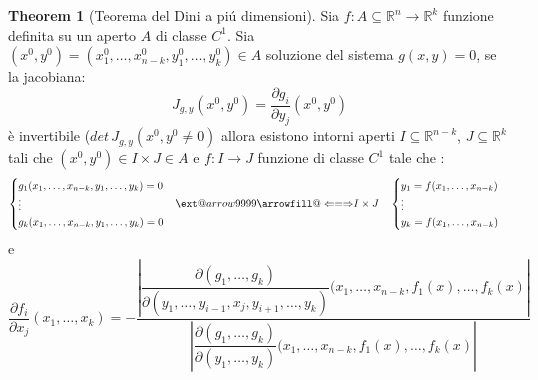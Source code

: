 \documentclass[leqno]{article}
\makeatletter
\newcommand\xLeftrightarrow[2][]{%
	\ext@arrow 9999{\Longleftrightarrowfill@}{#1}{#2}}
\newcommand\Longleftrightarrowfill@{%
	\arrowfill@\Leftarrow\Relbar\Rightarrow}
\theoremstyle{definition}
\numberwithin{equation}{section}
\newtheorem{theorem}{Theorem}[section]
\theoremstyle{remark}
\makeatother
\begin{document}
	\begin{theorem}[Teorema del Dini a piú dimensioni]
		Sia $f:A\subseteq \mathbb{R}^n \rightarrow \mathbb{R}^k$ funzione definita su un aperto $A$ di classe $C^1$. Sia $(x^0,y^0)=(x_1^0,\dots,x_{n-k}^0,y_1^0,\dots,y_k^0)\in A$ soluzione del sistema $g(x,y)=0$, se la jacobiana:
		\begin{equation}
			J_{g,y}(x^0,y^0)=\dfrac{\partial g_i}{\partial y_j}(x^0,y^0)
		\end{equation}
		è invertibile ($det \, J_{g,y}(x^0,y^0\neq 0)$ allora esistono intorni aperti $I\subseteq \mathbb{R}^{n-k}$, $J\subseteq \mathbb{R}^k$ tali che $(x^0,y^0)\in I \times J \in A$ e $f: I \rightarrow J$ funzione di classe $C^1$ tale che : 
		\begin{equation}
			\begin{split}
				\begin{cases}
					g_1(x_1,\dots,x_{n-k},y_1,\dots,y_k)=0\\
					\vdots \\
					g_k(x_1,\dots,x_{n-k},y_1,\dots,y_k)=0
				\end{cases}
			\end{split}
			\begin{split}
				\xLeftrightarrow{\text{$I \times J$}} \quad 
				\begin{cases}
					y_1=f(x_1,\dots,x_{n-k})\\
					\vdots \\
					y_k=f(x_1,\dots,x_{n-k})
				\end{cases}
			\end{split}
		\end{equation}
		e 
		\begin{equation}
			\dfrac{\partial f_i}{\partial x_j}(x_1,\dots,x_k)=-\dfrac{\left|{\dfrac{\partial(g_1,\dots,g_k)}{\partial(y_1,\dots,y_{i-1},x_j,y_{i+1},\dots,y_k)}(x_1,\dots ,x_{n-k},f_1(x),\dots,f_k(x)}\right|}{\left|{\dfrac{\partial(g_1,\dots,g_k)}{\partial(y_1,\dots,y_k)}(x_1,\dots ,x_{n-k},f_1(x),\dots,f_k(x)}\right|}
		\end{equation}
	\end{theorem}
	
\end{document}
